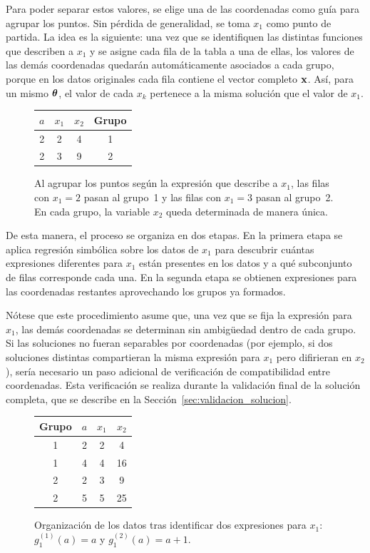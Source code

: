 Para poder separar estos valores, se elige una de las coordenadas como guía para agrupar los puntos. Sin pérdida de generalidad, se toma \(x_1\) como punto de partida. La idea es la siguiente: una vez que se identifiquen las distintas funciones que describen a \(x_1\) y se asigne cada fila de la tabla a una de ellas, los valores de las demás coordenadas quedarán automáticamente asociados a cada grupo, porque en los datos originales cada fila contiene el vector completo
\(\mathbf{x}\). Así, para un mismo \(\boldsymbol{\theta}\), el valor de cada \(x_k\)
pertenece a la misma solución que el valor de \(x_1\).

\begin{figure}[H]
\centering
\begin{tabular}{c|c|c|c}
$a$ & $x_1$ & $x_2$ & Grupo \\
\hline 2 & 2 & 4 & 1 \\
2 & 3 & 9 & 2 \\
\end{tabular}
\caption{Al agrupar los puntos según la expresión que describe a
\(x_1\), las filas con \(x_1 = 2\) pasan al grupo~1 y las filas con
\(x_1 = 3\) pasan al grupo~2. En cada grupo, la variable \(x_2\)
queda determinada de manera única.} \label{fig:agrupacion_coordenadas}
\end{figure}

De esta manera, el proceso se organiza en dos etapas. En la primera etapa se aplica regresión simbólica sobre los datos de \(x_1\) para descubrir cuántas expresiones diferentes para \(x_1\) están presentes en los datos y a qué subconjunto de filas corresponde cada una. En la segunda etapa se obtienen expresiones para las coordenadas restantes aprovechando los grupos ya formados.

Nótese que este procedimiento asume que, una vez que se fija la expresión para \(x_1\), las demás coordenadas se determinan sin ambigüedad dentro de cada grupo. Si las soluciones no fueran separables por coordenadas (por ejemplo, si dos soluciones distintas compartieran la misma expresión para \(x_1\) pero difirieran en
\(x_2\)), sería necesario un paso adicional de verificación de
compatibilidad entre coordenadas. Esta verificación se realiza durante la validación final de la solución completa, que se describe en la Sección~\ref{sec:validacion_solucion}.

\begin{figure}[H]
\centering \caption{Organización de los datos tras identificar dos expresiones para \(x_1\): \(g_1^{(1)}(a) = a\) y \(g_1^{(2)}(a) = a + 1\).} \label{fig:tabla_organizada}
\begin{tabular}{c|c|c|c}
Grupo & \(a\) & \(x_1\) & \(x_2\) \\
\hline 1 & 2 & 2 & 4 \\
1 & 4 & 4 & 16 \\[4pt]
2 & 2 & 3 & 9 \\
2 & 5 & 5 & 25
\end{tabular}
\end{figure}

